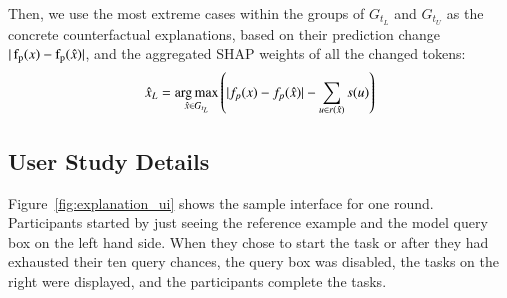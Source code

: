 Then, we use the most extreme cases within the groups of $G_{t_L}$ and $G_{t_U}$ as the concrete counterfactual explanations, based on their prediction change $|\operatorname*{f_p}(x)-\operatorname*{f_p}(\hat{x})|$, and the aggregated SHAP weights of all the changed tokens:
$$\hat{x}_L = \operatorname*{arg\,max}_{\hat{x} \in G_{t_L}} \left( |f_p(x)-f_p(\hat{x})| - \sum_{u\in r(\hat{x})} s(u) \right)$$ 


\subsection{User Study Details}
\label{appendix:exp_user_study}

Figure~\ref{fig:explanation_ui} shows the sample interface for one round. 
Participants started by just seeing the reference example and the model query box on the left hand side.
When they chose to start the task or after they had exhausted their ten query chances, the query box was disabled, the tasks on the right were displayed, and the participants complete the tasks.